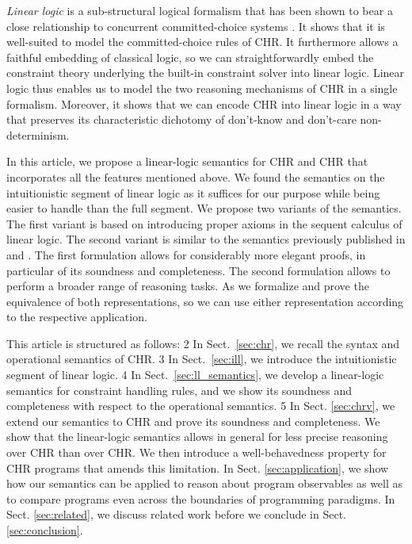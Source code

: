 \documentclass[acmtocl]{acmtrans2m}
\begin{document}
\emph{Linear logic} is a sub-structural logical formalism
\cite{DBLP:journals/tcs/Girard87} that has been shown  to bear a close
relationship to concurrent committed-choice systems
\cite{DBLP:conf/elp/Miller92,DBLP:journals/iandc/FagesRS01}. It shows that it is
well-suited to model the committed-choice rules of CHR. It furthermore allows a
faithful embedding of classical logic, so we can straightforwardly embed the
constraint theory underlying the built-in constraint solver into linear logic.
Linear logic thus enables us to model the two reasoning mechanisms of CHR in a
single formalism. Moreover, it shows that we can encode CHR into linear
logic in a way that preserves its characteristic dichotomy of don't-know and
don't-care non-determinism.

In this article, we propose a linear-logic semantics for CHR and CHR that
incorporates all the features mentioned above. We found the semantics on the
intuitionistic segment of linear logic as it suffices for our purpose while
being easier to handle than the full segment. We propose two variants of the
semantics. The first variant is based on introducing proper axioms in the
sequent calculus of linear logic. The second variant is similar to the
semantics previously published in  and
. The first formulation allows for considerably
more elegant proofs, in particular of its soundness and completeness. The
second formulation allows to perform a broader range of reasoning tasks. As we
formalize and prove the equivalence of both representations, so we can use
either representation according to the respective application.

This article is structured as follows:
2
In Sect.~\ref{sec:chr}, we recall the syntax and operational semantics of CHR.
3
In Sect.~\ref{sec:ill}, we introduce the intuitionistic segment of linear logic.
4
In Sect.~\ref{sec:ll_semantics}, we develop a linear-logic semantics
for constraint handling rules, and we show its soundness and completeness with
respect to the operational semantics.
5
In Sect. \ref{sec:chrv}, we extend our semantics to CHR and prove its
soundness and completeness. We show that the linear-logic semantics allows in
general for less precise reasoning over CHR than over CHR. We
then introduce a well-behavedness property for CHR programs that
amends this limitation.  In Sect. \ref{sec:application}, we show how our
semantics can be applied to reason about program observables as well as to
compare programs even across the boundaries of programming paradigms. In Sect.
\ref{sec:related}, we discuss related work before we conclude in Sect.
\ref{sec:conclusion}.
\end{document}
